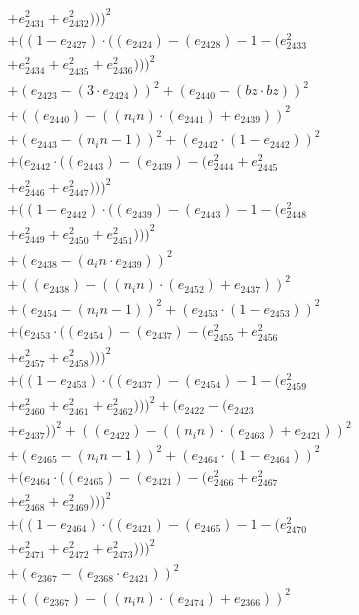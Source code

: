 \documentclass[10pt, a4paper]{article}
\begin{document}
\begin{small}
\begin{align*}
& + e_{2431}^{2} + e_{2432}^{2})))^{2} \\
& + ((1 - e_{2427})  \cdot  ((e_{2424}) - (e_{2428}) - 1 - (e_{2433}^{2} \\
& + e_{2434}^{2} + e_{2435}^{2} + e_{2436}^{2})))^{2} \\
& + (e_{2423} - (3  \cdot  e_{2424}))^{2} + (e_{2440} - (bz  \cdot  bz))^{2} \\
& + ((e_{2440}) - ((n_in)  \cdot  (e_{2441}) + e_{2439}))^{2} \\
& + (e_{2443} - (n_in - 1))^{2} + (e_{2442}  \cdot  (1 - e_{2442}))^{2} \\
& + (e_{2442}  \cdot  ((e_{2443}) - (e_{2439}) - (e_{2444}^{2} + e_{2445}^{2} \\
& + e_{2446}^{2} + e_{2447}^{2})))^{2} \\
& + ((1 - e_{2442})  \cdot  ((e_{2439}) - (e_{2443}) - 1 - (e_{2448}^{2} \\
& + e_{2449}^{2} + e_{2450}^{2} + e_{2451}^{2})))^{2} \\
& + (e_{2438} - (a_in  \cdot  e_{2439}))^{2} \\
& + ((e_{2438}) - ((n_in)  \cdot  (e_{2452}) + e_{2437}))^{2} \\
& + (e_{2454} - (n_in - 1))^{2} + (e_{2453}  \cdot  (1 - e_{2453}))^{2} \\
& + (e_{2453}  \cdot  ((e_{2454}) - (e_{2437}) - (e_{2455}^{2} + e_{2456}^{2} \\
& + e_{2457}^{2} + e_{2458}^{2})))^{2} \\
& + ((1 - e_{2453})  \cdot  ((e_{2437}) - (e_{2454}) - 1 - (e_{2459}^{2} \\
& + e_{2460}^{2} + e_{2461}^{2} + e_{2462}^{2})))^{2} + (e_{2422} - (e_{2423} \\
& + e_{2437}))^{2} + ((e_{2422}) - ((n_in)  \cdot  (e_{2463}) + e_{2421}))^{2} \\
& + (e_{2465} - (n_in - 1))^{2} + (e_{2464}  \cdot  (1 - e_{2464}))^{2} \\
& + (e_{2464}  \cdot  ((e_{2465}) - (e_{2421}) - (e_{2466}^{2} + e_{2467}^{2} \\
& + e_{2468}^{2} + e_{2469}^{2})))^{2} \\
& + ((1 - e_{2464})  \cdot  ((e_{2421}) - (e_{2465}) - 1 - (e_{2470}^{2} \\
& + e_{2471}^{2} + e_{2472}^{2} + e_{2473}^{2})))^{2} \\
& + (e_{2367} - (e_{2368}  \cdot  e_{2421}))^{2} \\
& + ((e_{2367}) - ((n_in)  \cdot  (e_{2474}) + e_{2366}))^{2} \\

\end{align*}
\end{small}
\end{document}
